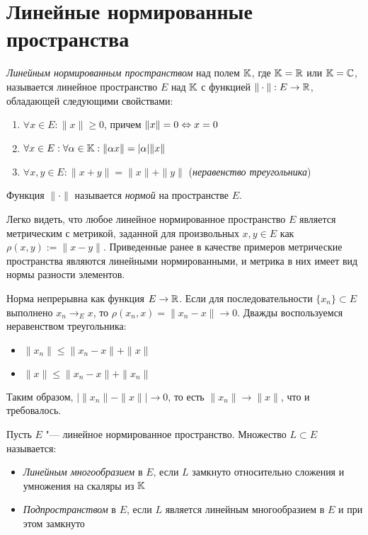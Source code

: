 \section{Линейные нормированные пространства}

\begin{definition}
	\textit{Линейным нормированным пространством} над полем $\mathbb{K}$, где $\mathbb{K} = \mathbb{R}$ или $\mathbb{K} = \mathbb{C}$, называется линейное пространство $E$ над $\mathbb{K}$ с функцией $\|\cdot\| : E \to \mathbb{R}$, обладающей следующими свойствами:
	\begin{enumerate}
		\item $\forall x \in E: \|x\| \ge 0$, причем $\|x\| = 0 \Leftrightarrow x = 0$
		\item $\forall x \in E: \forall \alpha \in \mathbb{K}: \|\alpha x\| = |\alpha|\|x\|$
		\item $\forall x, y \in E: \|x + y\| = \|x\| + \|y\|$ (\textit{неравенство треугольника})
	\end{enumerate}

	Функция $\|\cdot\|$ называется \textit{нормой} на пространстве $E$.
\end{definition}

\begin{example}
    Легко видеть, что любое линейное нормированное пространство $E$ является метрическим с метрикой, заданной для произвольных $x, y \in E$ как $\rho(x, y) := \|x - y\|$. Приведенные ранее в качестве примеров метрические пространства являются линейными нормированными, и метрика в них имеет вид нормы разности элементов.
\end{example}

\begin{note}
	Норма непрерывна как функция $E \to \mathbb{R}$. Если для последовательности $\{x_n\} \subset E$ выполнено $x_n \to_E x$, то $\rho(x_n, x) = \|x_n - x\| \to 0$. Дважды воспользуемся неравенством треугольника:
	\begin{itemize}
		\item $\|x_n\| \le \|x_n - x\| + \|x\|$
		\item $\|x\| \le \|x_n - x\| + \|x_n\|$
	\end{itemize}

	Таким образом, $\big|\|x_n\| - \|x\|\big| \to 0$, то есть $\|x_n\| \to \|x\|$, что и требовалось.
\end{note}

\begin{definition}
	Пусть $E$ "--- линейное нормированное пространство. Множество $L \subset E$ называется:
	\begin{itemize}
		\item \textit{Линейным многообразием} в $E$, если $L$ замкнуто относительно сложения и умножения на скаляры из $\mathbb{K}$
  		\item \textit{Подпространством} в $E$, если $L$ является линейным многообразием в $E$ и при этом замкнуто 
	\end{itemize}
\end{definition}


